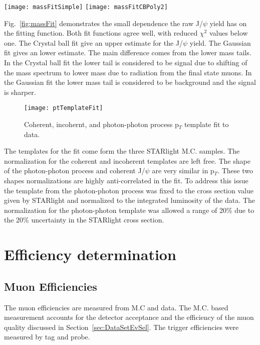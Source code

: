       \begin{figure*}[!Hhtb]
        \centering
        \texttt{[image: massFitSimple]}
        \texttt{[image: massFitCBPoly2]}
        \caption{Mass fit to J/$\psi$ using Gaussian (Left) and Crystal Ball (Right) for the 
          signal and a polynomial for the background}
        \label{fig:massFit}
      \end{figure*}

    Fig.~\ref{fig:massFit} demonstrates the small dependence the raw J/$\psi$ 
      yield has on the fitting function. 
    Both fit functions agree well, with reduced $\chi^{2}$ values below one.
    The Crystal ball fit give an upper estimate for the J/$\psi$ yield.
    The Gaussian fit gives an lower estimate. 
    The main difference comes from the lower mass tails.
    In the Crystal ball fit the lower tail is considered to be signal due to 
      shifting of the mass spectrum to lower mass due to radiation from the 
      final state muons. 
    In the Gaussian fit the lower mass tail is considered to be background and 
      the signal is sharper.

      \begin{figure}[!Hhtb]
        \centering
        \texttt{[image: ptTemplateFit]}
        \caption{Coherent, incohernt, and photon-photon process p$_{T}$ template fit to data.}
        \label{fig:ptTempFit}
      \end{figure}

      The templates for the fit come form the three STARlight M.C. samples. 
      The normalization for the coherent and incoherent templates are left
        free. 
      The shape of the photon-photon process and coherent J/$\psi$ are very 
        similar in p$_{T}$.
      These two shapes normalizations are highly anti-correlated in the fit.
      To address this issue the template from the photon-photon process was 
        fixed to the cross section value given by STARlight and normalized to
        the integrated luminosity of the data. 
      The normalization for the photon-photon template was allowed a range of 
        20\% due to the 20\% uncertainty in the STARlight cross section.

  \section{\label{sec:effDet} Efficiency determination}
    \subsection{Muon Efficiencies}
      The muon efficiencies are measured from M.C and data.
      The M.C. based measurement accounts for the detector acceptance and the 
        efficiency of the muon quality discussed in 
        Section~\ref{sec:DataSetEvSel}.
      The trigger efficiencies were measured by tag and probe.
      

